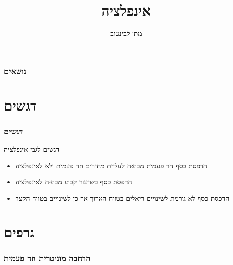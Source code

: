 \documentclass[usenames,dvipsnames]{beamer}
\title[]{אינפלציה}
\author{מתן לבינטוב}
\institute[{{ אב"ג}}]{{ אוניברסיטת בן גוריון בנגב}}
\date{}
\begin{document}
\begin{RTL}
\begin{frame}
\titlepage
\end{frame}
\begin{frame}
    \frametitle{נושאים}
    \tableofcontents

    

\end{frame}

\section{דגשים}
\begin{frame}
    \frametitle{דגשים}
    \begin{block}{דגשים לגבי אינפלציה}
        \begin{itemize}
            \item הדפסת כסף חד פעמית מביאה לעליית מחירים חד פעמית ולא לאינפלציה
            \item הדפסת כסף בשיעור קבוע מביאה לאינפלציה
            \item הדפסת כסף לא גורמת לשינויים ריאלים בטווח הארוך אך כן לשינויים בטווח הקצר
        \end{itemize}
    \end{block}
    

\end{frame}

\section{גרפים}
\begin{frame}[allowframebreaks]
    \frametitle{הרחבה מוניטרית חד פעמית}
    \begin{center}
\end{center}
\end{frame}
\end{RTL}
\end{document}
